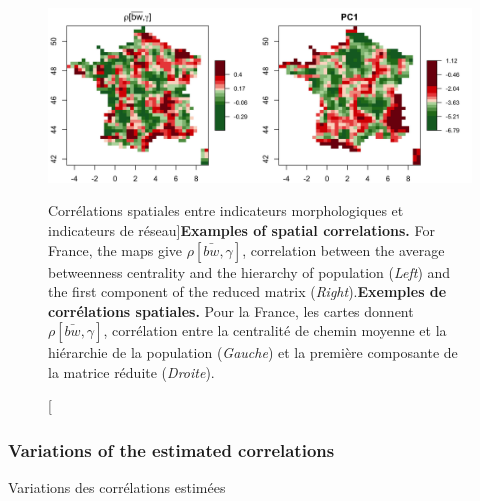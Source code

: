 \begin{figure}[h!]
\includegraphics[width=\linewidth]{Figures/Final/4-1-3-fig-staticcorrs-mapscorrs}
\caption[Spatial correlations between morphological indicators and network indicators][Corrélations spatiales entre indicateurs morphologiques et indicateurs de réseau]{\textbf{Examples of spatial correlations.} For France, the maps give $\rho\left[\bar{bw},\gamma\right]$, correlation between the average betweenness centrality and the hierarchy of population (\textit{Left}) and the first component of the reduced matrix (\textit{Right}).\label{fig:staticcorrs:mapscorrs}}{\textbf{Exemples de corrélations spatiales.} Pour la France, les cartes donnent $\rho\left[\bar{bw},\gamma\right]$, corrélation entre la centralité de chemin moyenne et la hiérarchie de la population (\textit{Gauche}) et la première composante de la matrice réduite (\textit{Droite}).\label{fig:staticcorrs:mapscorrs}}
\end{figure}



\subsubsection{Variations of the estimated correlations}{Variations des corrélations estimées}


